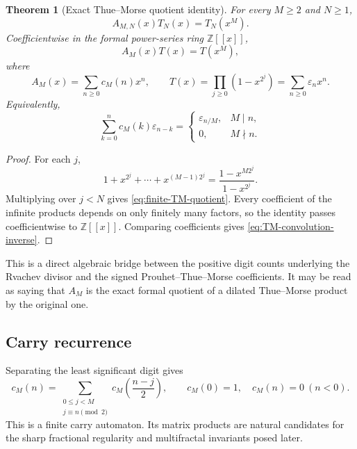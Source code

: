 \documentclass[11pt,oneside]{article}
\newtheorem{theorem}{Theorem}[section]
\theoremstyle{definition}
\theoremstyle{remark}
\newcommand{\Z}{\mathbb Z}
\numberwithin{equation}{section}
\newcommand{\eps}{\varepsilon}
\newcommand{\1}{\mathbf 1}
\begin{document}
\begin{theorem}[Exact Thue--Morse quotient identity]
\label{thm:TM-quotient}
For every $M\ge2$ and $N\ge1$,
\begin{equation}
 \boxed{A_{M,N}(x)T_N(x)=T_N(x^M).}
 \label{eq:finite-TM-quotient}
\end{equation}
Coefficientwise in the formal power-series ring $\Z[[x]]$,
\begin{equation}
 A_M(x)T(x)=T(x^M),
 \label{eq:infinite-TM-quotient}
\end{equation}
where
\begin{equation}
 A_M(x)=\sum_{n\ge0}c_M(n)x^n,
 \qquad
 T(x)=\prod_{j\ge0}(1-x^{2^j})=\sum_{n\ge0}\eps_nx^n.
 \label{eq:AM-T}
\end{equation}
Equivalently,
\begin{equation}
 \sum_{k=0}^{n}c_M(k)\eps_{n-k}
 =\begin{cases}
 \eps_{n/M},&M\mid n,\\
 0,&M\nmid n.
 \end{cases}
 \label{eq:TM-convolution-inverse}
\end{equation}
\end{theorem}

\begin{proof}
For each $j$,
\[
 1+x^{2^j}+\cdots+x^{(M-1)2^j}
 =\frac{1-x^{M2^j}}{1-x^{2^j}}.
\]
Multiplying over $j<N$ gives \eqref{eq:finite-TM-quotient}.  Every coefficient of the
infinite products depends on only finitely many factors, so the identity passes
coefficientwise to $\Z[[x]]$.  Comparing coefficients gives \eqref{eq:TM-convolution-inverse}.
\end{proof}

This is a direct algebraic bridge between the positive digit counts underlying the Rvachev
divisor and the signed Prouhet--Thue--Morse coefficients.  It may be read as saying that
$A_M$ is the exact formal quotient of a dilated Thue--Morse product by the original one.

\subsection{Carry recurrence}

Separating the least significant digit gives
\begin{equation}
 c_M(n)=
 \sum_{\substack{0\le j<M\\j\equiv n\pmod2}}
 c_M\!\left(\frac{n-j}{2}\right),
 \qquad
 c_M(0)=1,
 \quad c_M(n)=0\ (n<0).
 \label{eq:cM-recurrence}
\end{equation}
This is a finite carry automaton.  Its matrix products are natural candidates for the sharp
fractional regularity and multifractal invariants posed later.
\end{document}
